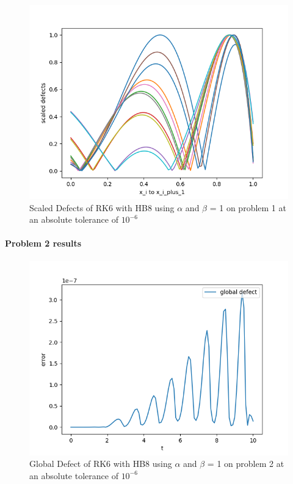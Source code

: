 \documentclass{article}
\begin{document}
\begin{figure}[H]
\centering
\includegraphics[width=0.7\linewidth]{./figures/static_alpha_rk6_with_hb8_p1_scaled_defects}
\caption{Scaled Defects of RK6 with HB8 using $\alpha$ and $\beta$ = 1 on problem 1 at an absolute tolerance of $10^{-6}$}
\label{fig:static_alpha_rk6_with_hb8_p1_scaled_defects}
\end{figure}

\paragraph{Problem 2 results}
\begin{figure}[H]
\centering
\includegraphics[width=0.7\linewidth]{./figures/static_alpha_rk6_with_hb8_p2_global_defect}
\caption{Global Defect of RK6 with HB8 using $\alpha$ and $\beta$ = 1 on problem 2 at an absolute tolerance of $10^{-6}$}
\label{fig:static_alpha_rk6_with_hb8_p2_global_defect}
\end{figure}
\end{document}
